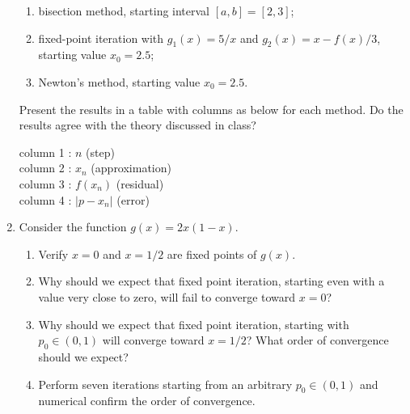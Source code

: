 \documentclass [12pt]{article}
\begin{document}
\begin{enumerate}
\begin{enumerate}

\item bisection method, starting interval $[a, b] = [2, 3]$;

\item fixed-point iteration with $g_1(x) = 5/x$ and $g_2(x) = x - f(x)/3$, starting value $x_0 = 2.5$;

\item Newton's method, starting value $x_0 = 2.5$.

\end{enumerate}

Present the results in a table with columns as below for each method. Do the results agree
with the theory discussed in class?

\hspace*{20pt} column 1 : $n$ (step)
\\[5pt]
\hspace*{20pt}  column 2 : $x_n$ (approximation)
\\[5pt]
\hspace*{20pt}  column 3 : $f(x_n)$  (residual)
\\[5pt]
\hspace*{20pt}  column 4 : $|p - x_n|$  (error)

\item Consider the function $g(x)=2x(1-x)$.

\begin{enumerate}

\item Verify $x=0$ and $x=1/2$ are fixed points of $g(x)$.

\item Why should we expect that fixed point iteration, starting even with a value very close to zero, will fail to converge toward $x=0$?

\item Why should we expect that fixed point iteration, starting with $p_0\in(0,1)$ will converge toward $x=1/2$? What order of convergence should we expect?

\item Perform seven iterations starting from an arbitrary $p_0\in(0,1)$ and numerical confirm the order of convergence.

\end{enumerate}




\end{enumerate}
\end{document}
